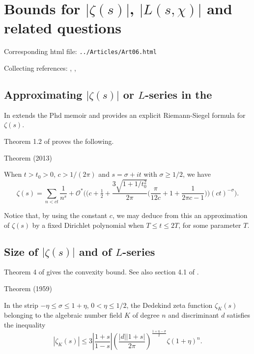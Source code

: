 \chapter{   Bounds for $|\zeta(s)|$, $|L(s,\chi)|$ and related questions}

Corresponding html file: \texttt{../Articles/Art06.html}









Collecting references:
\cite{Trudgian*11},
\cite{Kadiri-Ng*12},

 
 

\par 
\section{Approximating $|\zeta(s)|$ or $L$-series in the}



In
\cite{Reyna*11}
extends the
Phd memoir
\cite{Gabcke*79}
and provides an explicit Riemann-Siegel formula for $\zeta(s)$.

Theorem 1.2 of
\cite{Kadiri*13}
proves the following.
\par 
\begin{thm}{Theorem (2013)}

  When $t > t_0 > 0$, $c > 1/(2\pi)$ and $s = \sigma +it$ with
  $\sigma\ge 1/2$, we have
  $$
  \zeta(s)
  =\sum_{n < c t} \frac{1}{n^s}
	     + \mathcal{O}^* \biggl(
	     \biggl(c+\tfrac12+\frac{3\sqrt{1+1/t_0^2}}{2\pi}
	     \biggl(\frac{\pi}{12c}+1+\frac{1}{2\pi c-1}\biggr)
	     \biggr)
	     (ct)^{-\sigma}\biggr).
  $$
\end{thm}

Notice that, by using the constant $c$, we may deduce from this an
approximation of $\zeta(s)$ by a fixed Dirichlet polynomial when $T
\le t\le 2T$, for some parameter $T$.


\par 

\section{Size of $|\zeta(s)|$ and of $L$-series}



Theorem 4 of \cite{Rademacher*59} gives
the convexity bound. See also section 4.1 of \cite{Trudgian*13}.
\par 
\begin{thm}{Theorem (1959)}

In the strip $-\eta\le \sigma\le 1+\eta$, $0 < \eta\le 1/2$, the Dedekind zeta
function $\zeta_K(s)$ belonging to the algebraic number field $K$ of degree
$n$ and discriminant $d$ satisfies the inequality
$$
|\zeta_K(s)|\le 3 \left|\frac{1+s}{1-s}\right|
\left(\frac{|d||1+s|}{2\pi}\right)^{\frac{1+\eta-\sigma}{2}}
\zeta(1+\eta)^n.
$$
\end{thm}


